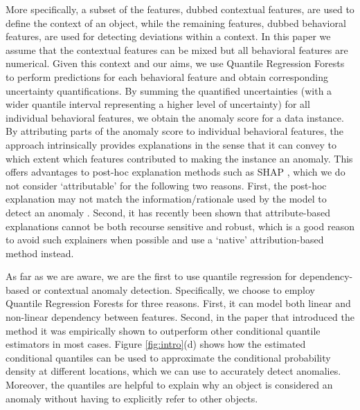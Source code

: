 \documentclass[pdflatex,sn-basic]{sn-jnl}%
\theoremstyle{thmstyleone}%
\theoremstyle{thmstyletwo}%
\theoremstyle{thmstylethree}%
\begin{document}
More specifically, a subset of the features, dubbed contextual features, are used to define the context of an object, while the remaining features, dubbed behavioral features, are used for detecting deviations within a context. In this paper we assume that the contextual features can be mixed but all behavioral features are numerical. Given this context and our aims, we use Quantile Regression Forests \citep{meinshausen2006quantile} to perform predictions for each behavioral feature and obtain corresponding uncertainty quantifications. By summing the quantified uncertainties (with a wider quantile interval representing a higher level of uncertainty) for all individual behavioral features, we obtain the anomaly score for a data instance. By attributing parts of the anomaly score to individual behavioral features, the approach intrinsically provides explanations in the sense that it can convey to which extent which features contributed to making the instance an anomaly. This offers advantages to post-hoc explanation methods such as SHAP \citep{lundberg2017unified}, which we do not consider `attributable' for the following two reasons. First, the post-hoc explanation may not match the information/rationale used by the model to detect an anomaly \citep{li2022survey}. Second, it has recently been shown \citep{fokkema2022attribution} that attribute-based explanations cannot be both recourse sensitive and robust, which is a good reason to avoid such explainers when possible and use a `native' attribution-based method instead.

As far as we are aware, we are the first to use quantile regression for dependency-based or contextual anomaly detection. Specifically, we choose to employ Quantile Regression Forests for three reasons. First, it can model both linear and non-linear dependency between features. Second, in the paper that introduced the method it was empirically shown to outperform other conditional quantile estimators in most cases. Figure \ref{fig:intro}(d) shows how the estimated conditional quantiles can be used to approximate the conditional probability density at different locations, which we can use to accurately detect anomalies. Moreover, the quantiles are helpful to explain why an object is considered an anomaly without having to explicitly refer to other objects.

\end{document}
